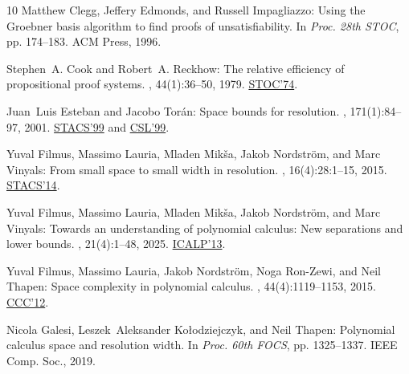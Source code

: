 \begin{thebibliography}{10}
{\sc Matthew Clegg, Jeffery Edmonds, and Russell Impagliazzo}: Using the
  {G}roebner basis algorithm to find proofs of unsatisfiability.
\newblock In {\em Proc. 28th STOC}, pp. 174--183. ACM Press, 1996.
\newblock [\epfmtdoi{10.1145/237814.237860}]

{\sc Stephen~A. Cook and Robert~A. Reckhow}: The relative efficiency of
  propositional proof systems.
, 44(1):36--50, 1979.
\newblock \prelim \href{https://dl.acm.org/doi/10.1145/800119.803893}{STOC'74}.
\newblock [\epfmtdoi{10.2307/2273702}]

{\sc Juan~Luis Esteban and Jacobo Tor\'an}: Space bounds for resolution.
, 171(1):84--97, 2001.
\newblock \prelim \href{https://doi.org/10.1007/3-540-49116-3\_52}{STACS'99}
  and \href{https://doi.org/10.1007/3-540-48168-0\_26}{CSL'99}.

{\sc Yuval Filmus, Massimo Lauria, Mladen Mik\v{s}a, Jakob Nordstr{\"{o}}m, and
  Marc Vinyals}: From small space to small width in resolution.
, 16(4):28:1--15, 2015.
\newblock \prelim
  \href{https://doi.org/10.4230/LIPIcs.STACS.2014.300}{STACS'14}.
\newblock [\epfmtdoi{10.1145/2746339}]

{\sc Yuval Filmus, Massimo Lauria, Mladen Mik\v{s}a, Jakob Nordstr\"om, and
  Marc Vinyals}: Towards an understanding of polynomial calculus: {N}ew
  separations and lower bounds.
, 21(4):1--48, 2025.
\newblock \prelim
  \href{https://doi.org/10.1007/978-3-642-39206-1\_37}{ICALP'13}.

{\sc Yuval Filmus, Massimo Lauria, Jakob Nordström, Noga Ron-Zewi, and Neil
  Thapen}: Space complexity in polynomial calculus.
, 44(4):1119--1153, 2015.
\newblock \prelim \href{https://doi.org/10.1109/CCC.2012.27}{CCC'12}.
\newblock [\epfmtdoi{10.1137/120895950}]

{\sc Nicola Galesi, Leszek~Aleksander Kołodziejczyk, and Neil Thapen}:
  Polynomial calculus space and resolution width.
\newblock In {\em Proc. 60th FOCS}, pp. 1325--1337. IEEE Comp. Soc., 2019.


\end{thebibliography}
